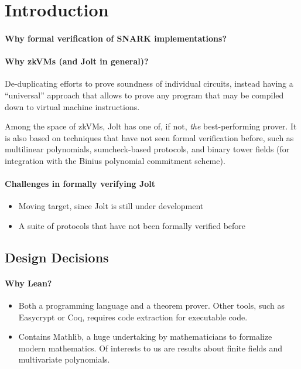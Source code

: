 \section{Introduction}\label{sec:intro}

\paragraph{Why formal verification of SNARK implementations?}

\paragraph{Why zkVMs (and Jolt in general)?}

De-duplicating efforts to prove soundness of individual circuits, instead having a ``universal'' approach that allows to prove any program that may be compiled down to virtual machine instructions.

Among the space of zkVMs, Jolt has one of, if not, \emph{the} best-performing prover. It is also based on techniques that have not seen formal verification before, such as multilinear polynomials, sumcheck-based protocols, and binary tower fields (for integration with the Binius polynomial commitment scheme).

\paragraph{Challenges in formally verifying Jolt}

\begin{itemize}
    \item Moving target, since Jolt is still under development
    \item A suite of protocols that have not been formally verified before
\end{itemize}

\subsection{Design Decisions}


\paragraph{Why Lean?}

\begin{itemize}
    \item Both a programming language and a theorem prover. Other tools, such as Easycrypt or Coq, requires code extraction for executable code.
    \item Contains Mathlib, a huge undertaking by mathematicians to formalize modern mathematics. Of interests to us are results about finite fields and multivariate polynomials.
\end{itemize}

